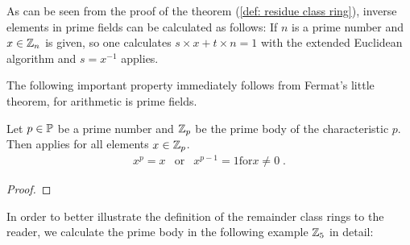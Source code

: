 \begin{remark} As can be seen from the proof of the theorem (\ref{def: residue class ring}), inverse elements in prime fields can be calculated as follows: If $ n $ is a prime number and $ x \in \mathbb{Z}_n $ is given, so one calculates $ s \times x + t \times n = 1 $ with the extended Euclidean algorithm and $ s = x ^{- 1} $ applies.
\end{remark}
The following important property immediately follows from Fermat's little theorem, for arithmetic is prime fields.
\begin{lemma}
\label{lemma: klein_satz_fermat}
Let $ p \in \mathbb{P} $ be a prime number and $ \mathbb{Z}_p $ be the prime body of the characteristic $ p $. Then applies
for all elements $ x \in \mathbb{Z}_p $.
\begin{equation}
\begin{array}{ccc}
x^p = x & \text{or} & x^{p-1} = 1 \text{for} x \neq 0 \;.
\end{array}
\end{equation}
\end{lemma}
\begin{proof}
\end{proof}
In order to better illustrate the definition of the remainder class rings to the reader, we calculate the prime body in the following example
$ \mathbb{Z}_5 $ in detail:
